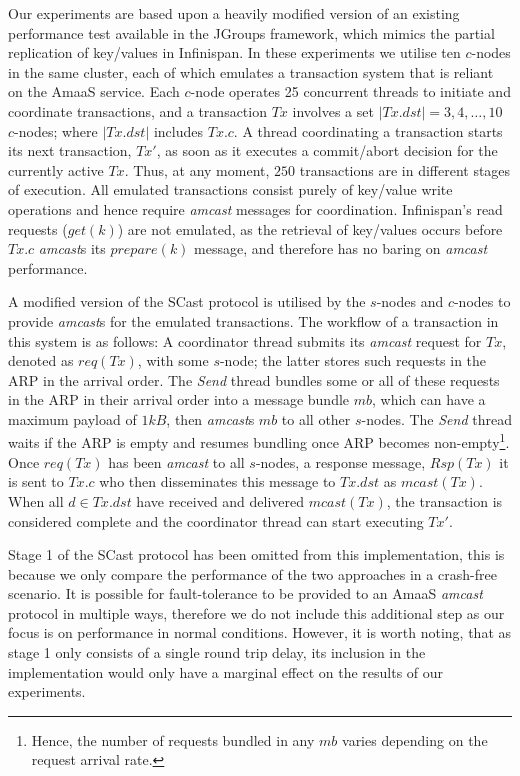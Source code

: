 	Our experiments are based upon a heavily modified version of an existing performance test available in the JGroups\citep{JGroups} framework, which mimics the partial replication of key/values in Infinispan\citep{Infinispan}.  In these experiments we utilise ten $c$-nodes in the same cluster, each of which emulates a transaction system that is reliant on the \textsf{AmaaS} service.  Each $c$-node operates 25 concurrent threads to initiate and coordinate transactions, and a transaction $Tx$ involves a set $|Tx.dst| = 3,4,\ldots,10$ $c$-nodes; where $|Tx.dst|$ includes $Tx.c$. A thread coordinating a transaction starts its next transaction, $Tx'$, as soon as it executes a commit/abort decision for the currently active $Tx$. Thus, at any moment, $250$ transactions are in different stages of execution.  All emulated transactions consist purely of key/value write operations and hence require \emph{amcast} messages for coordination.  Infinispan's read requests ($get(k)$) are not emulated, as the retrieval of key/values occurs before $Tx.c$ \emph{amcast}s its $prepare(k)$ message, and therefore has no baring on \emph{amcast} performance.  
	
	A modified version of the \textsf{SCast} protocol is utilised by the $s$-nodes and $c$-nodes to provide \emph{amcast}s for the emulated transactions.  The workflow of a transaction in this system is as follows: A coordinator thread submits its \emph{amcast} request for $Tx$, denoted as $req(Tx)$, with some $s$-node; the latter stores such requests in the ARP in the arrival order. The \emph{Send} thread bundles some or all of these requests in the ARP in their arrival order into a message bundle $mb$, which can have a maximum payload of $1kB$, then \emph{amcast}s $mb$ to all other $s$-nodes.  The \emph{Send} thread waits if the ARP is empty and resumes bundling once ARP becomes non-empty\footnote{Hence, the number of requests bundled in any $mb$ varies depending on the request arrival rate.}. Once $req(Tx)$ has been \emph{amcast} to all $s$-nodes, a response message, $Rsp(Tx)$ it is sent to $Tx.c$ who then disseminates this message to $Tx.dst$ as $mcast(Tx)$.  When all $d \in Tx.dst$ have received and delivered $mcast(Tx)$, the transaction is considered complete and the coordinator thread can start executing $Tx'$.  
	
    Stage 1 of the \textsf{SCast} protocol has been omitted from this implementation, this is because we only compare the performance of the two approaches in a crash-free scenario.  It is possible for fault-tolerance to be provided to an \textsf{AmaaS} \emph{amcast} protocol in multiple ways, therefore we do not include this additional step as our focus is on performance in normal conditions.  However, it is worth noting, that as stage 1 only consists of a single round trip delay, its inclusion in the implementation would only have a marginal effect on the results of our experiments.  
	
